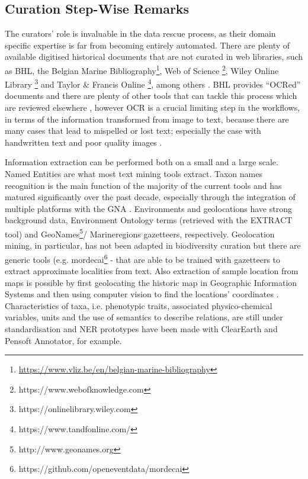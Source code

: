    \subsection{Curation Step-Wise Remarks}
   The curators’ role is invaluable in the data rescue process, as their domain
specific expertise is far from becoming entirely automated. There are plenty of
available digitised historical documents that are not curated in web libraries,
such as BHL, the Belgian Marine
Bibliography\footnote{\url{https://www.vliz.be/en/belgian-marine-bibliography}},
Web of Science \footnote{https://www.webofknowledge.com}, Wiley Online
Library \footnote{https://onlinelibrary.wiley.com} and Taylor \& Francis
Online \footnote{https://www.tandfonline.com/}, among others \citep{kearney_its_2019}.
BHL provides “OCRed” documents and there are plenty of other tools that can
tackle this process which are reviewed elsewhere \citep{10.3897/rio.6.e58030},
however OCR is a crucial limiting step in the workflows, in terms of the
information transformed from image to text, because there are many cases that
lead to mispelled or lost text; especially the case with handwritten text and
poor quality images \citep{lyal_digitising_2016}.

Information extraction can be performed both on a small and a large scale.
Named Entities are what most text mining tools extract. Taxon names recognition
is the main function of the majority of the current tools and has matured
significantly over the past decade, especially through the integration of
multiple platforms with the GNA \citep{pyle_towards_2016}. Environments and
geolocations have strong background data, Environment Ontology terms (retrieved
with the EXTRACT tool) and GeoNames\footnote{http://www.geonames.org}/
Marineregions gazetteers, respectively. Geolocation mining, in particular, has
not been adapted in biodiversity curation but there are generic tools
(e.g. mordecai\footnote{https://github.com/openeventdata/mordecai} -
\citep{halterman2017mordecai} that are able to be trained with gazetteers to
extract approximate localities from text. Also extraction of sample location
from maps is possible by first geolocating the historic map in Geographic
Information Systems \citep{jenny_studying_2011} and then using computer vision
to find the locations’ coordinates \citep{10.1145/2557423}. Characteristics of
taxa, i.e. phenotypic traits, associated physico-chemical variables, units and
the use of semantics to describe relations, are still under standardisation
\citep{thessen_transforming_2020} and NER prototypes have been made with
ClearEarth and Pensoft Annotator, for example.

